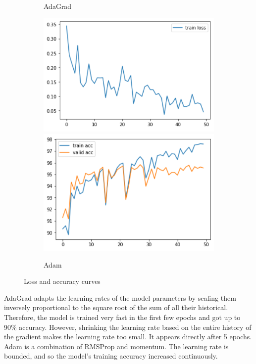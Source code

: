 \documentclass[11pt]{article}
\begin{document}
\begin{figure}[H]
\begin{subfigure}[H]{1\textwidth}
            \caption{AdaGrad}\vspace{2mm}
        \end{subfigure}
        \begin{subfigure}[H]{1\textwidth}
            \includegraphics[width=0.5\linewidth]{img/Adam/loss.PNG}
            \includegraphics[width=0.5\linewidth]{img/Adam/acc.PNG}
            \caption{Adam}
        \end{subfigure}
        \caption{Loss and accuracy curves}
        \label{fig14}
    \end{figure}
    AdaGrad adapts the learning rates of the model parameters by scaling them inversely proportional to the square root of the sum of all their historical. Therefore, the model is trained very fast in the first few epochs and got up to 90\% accuracy. However, shrinking the learning rate based on the entire history of the gradient makes the learning rate too small. It appears directly after 5 epochs. Adam is a combination of RMSProp and momentum. The learning rate is bounded, and so the model's training accuracy increased continuously.
    
\end{document}
